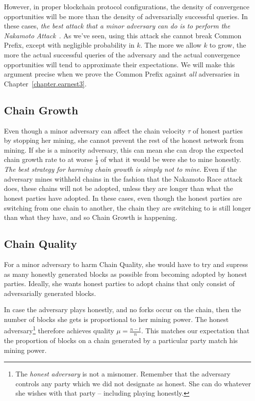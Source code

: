 However, in proper blockchain protocol configurations, the density of convergence
opportunities will be more than the density of adversarially successful queries.
In these cases, \emph{the best attack that a minor adversary can do is to perform the
Nakamoto Attack}~\cite{nakamoto-wins}. As we've seen, using this attack she cannot break Common Prefix,
except with negligible probability in $k$. The more we allow $k$ to grow, the more the actual successful
queries of the adversary and the actual convergence opportunities will tend to
approximate their expectations. We will make this argument precise when we
prove the Common Prefix against \emph{all} adversaries in Chapter~\ref{chapter.earnest3}.

\subsection*{Chain Growth}
Even though a minor adversary can affect the chain velocity $\tau$ of honest
parties by stopping her mining, she cannot prevent the rest of the honest network
from mining. If she is a minority adversary, this can mean she can drop the expected
chain growth rate to at worse $\frac{1}{2}$ of what it would be were she to mine honestly.
\emph{The best strategy for harming chain growth is simply not to mine}.
Even if the adversary mines withheld chains in the fashion that the Nakamoto Race
attack does, these chains will not be adopted, unless they are longer than what
the honest parties have adopted. In these cases, even though the honest parties are
switching from one chain to another, the chain they are switching to is still longer
than what they have, and so Chain Growth is happening.

\subsection*{Chain Quality}
For a minor adversary to harm Chain Quality, she would have to try and supress as many
honestly generated blocks as possible from becoming adopted by honest parties. Ideally,
she wants honest parties to adopt chains that only consist of adversarially generated blocks.

In case the adversary plays honestly, and no forks occur on the chain, then the number of
blocks she gets is proportional to her mining power. The honest adversary\footnote{The
\emph{honest adversary} is not a misnomer. Remember that the adversary controls any party which
we did not designate as honest. She can do whatever she wishes with that party -- including
playing honestly.}
therefore achieves quality $\mu = \frac{n - t}{n}$. This matches our expectation that
the proportion of blocks on a chain generated by a particular party match his mining power.

